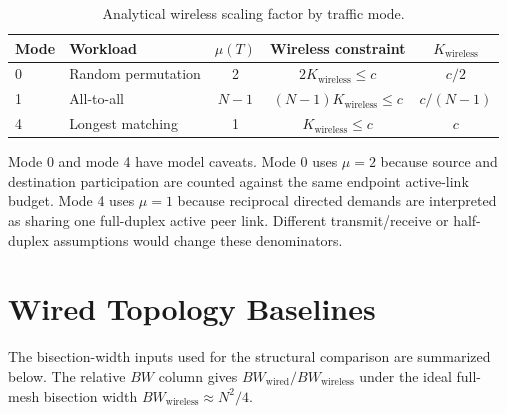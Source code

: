 \documentclass[conference]{IEEEtran}
\begin{document}
\begin{table}[!t]
\centering
\caption{Analytical wireless scaling factor by traffic mode.}
\small
\begin{tabular}{llccc}
\toprule
Mode & Workload & \(\mu(T)\) & Wireless constraint & \(K_{\mathrm{wireless}}\) \\
\midrule
0 & Random permutation & 2 & \(2K_{\mathrm{wireless}} \le c\) & \(c/2\) \\
1 & All-to-all & \(N-1\) & \((N-1)K_{\mathrm{wireless}} \le c\) & \(c/(N-1)\) \\
4 & Longest matching & 1 & \(K_{\mathrm{wireless}} \le c\) & \(c\) \\
\bottomrule
\end{tabular}
\end{table}

Mode 0 and mode 4 have model caveats. Mode 0 uses \(\mu=2\) because source and destination participation are counted against the same endpoint active-link budget. Mode 4 uses \(\mu=1\) because reciprocal directed demands are interpreted as sharing one full-duplex active peer link. Different transmit/receive or half-duplex assumptions would change these denominators.

\section{Wired Topology Baselines}

The bisection-width inputs used for the structural comparison are summarized below. The relative \(BW\) column gives \(BW_{\mathrm{wired}}/BW_{\mathrm{wireless}}\) under the ideal full-mesh bisection width \(BW_{\mathrm{wireless}}\approx N^2/4\).

\begin{table}[!t]
\centering
\caption{Bisection-width inputs and ideal relative \(BW\) for wired baselines.}
\scriptsize
{}
\end{table}
\end{document}
